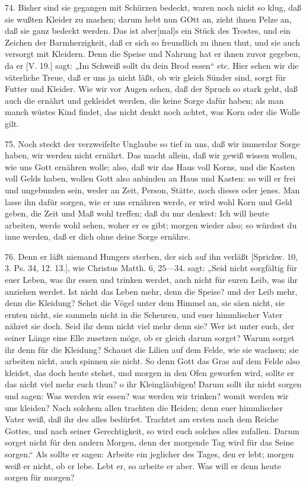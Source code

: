 74. Bisher sind sie gegangen mit Schürzen bedeckt, waren noch nicht so klug, daß sie wußten Kleider zu machen; darum hebt nun GOtt an, zieht ihnen Pelze an, daß sie ganz bedeckt werden. Das ist aber[mal]s ein Stück des Trostes, und ein Zeichen der Barmherzigkeit, daß er sich so freundlich zu ihnen thut, und sie auch versorgt mit Kleidern. Denn die Speise und Nahrung hat er ihnen zuvor gegeben, da er [V. 19.] sagt: „Im Schweiß sollt du dein Brod essen“ etc. Hier sehen wir die väterliche Treue, daß er uns ja nicht läßt, ob wir gleich Sünder sind, sorgt für Futter und Kleider. Wie wir vor Augen sehen, daß der Spruch so stark geht, daß auch die ernährt und gekleidet werden, die keine Sorge dafür haben; als man manch wüstes Kind findet, das nicht denkt noch achtet, was Korn oder die Wolle gilt.

75. Noch steckt der verzweifelte Unglaube so tief in uns, daß wir immerdar Sorge haben, wir werden nicht ernährt. Das macht allein,
daß wir gewiß wissen wollen, wie uns Gott ernähren wolle; also, daß wir das Haus voll Korns, und die Kasten voll Gelds haben, wollen Gott also anbinden an Haus und Kasten: so will er frei und ungebunden sein, weder an Zeit, Person, Stätte, noch dieses oder jenes. Man lasse ihn dafür sorgen, wie er uns ernähren werde, er wird wohl Korn und Geld geben, die Zeit und Maß wohl treffen; daß du nur denkest: Ich will heute arbeiten, werde wohl sehen, woher er es gibt; morgen wieder also; so würdest du inne werden, daß er dich ohne deine Sorge ernähre.

76. Denn er läßt niemand Hungers sterben, der sich auf ihn verläßt [Sprichw. 10, 3. Ps. 34, 12. 13.], wie Christus Matth. 6, 25—34. sagt: „Seid nicht sorgfältig für euer Leben, was ihr essen und trinken werdet, auch nicht für euren Leib, was ihr anziehen werdet. Ist nicht das Leben mehr, denn die Speise? und der Leib mehr, denn die Kleidung? Sehet die Vögel unter dem Himmel an, sie säen nicht, sie ernten nicht, sie sammeln nicht in die Scheuren, und euer himmlischer Vater nähret sie doch. Seid ihr denn nicht viel mehr denn sie? Wer ist unter euch, der seiner Länge eine Elle zusetzen möge, ob er gleich darum sorget? Warum sorget ihr denn für die Kleidung? Schauet die Lilien auf dem Felde, wie sie wachsen; sie arbeiten nicht, auch spinnen sie nicht. So denn Gott das Gras auf dem Felde also kleidet, das doch heute stehet, und morgen in den Ofen geworfen wird, sollte er das nicht viel mehr euch thun? o ihr Kleingläubigen! Darum sollt ihr nicht sorgen und sagen: Was werden wir essen? was werden wir trinken? womit werden wir uns kleiden? Nach solchem allen trachten die Heiden; denn euer himmlischer Vater weiß, daß ihr des alles bedürfet. Trachtet am ersten nach dem Reiche Gottes, und nach seiner Gerechtigkeit, so wird euch solches alles zufallen. Darum sorget nicht für den andern Morgen, denn der morgende Tag wird für das Seine sorgen.“ Als sollte er sagen: Arbeite ein jeglicher des Tages, den er lebt; morgen weiß er nicht, ob er lebe. Lebt er, so arbeite er aber. Was will er denn heute sorgen für morgen?

